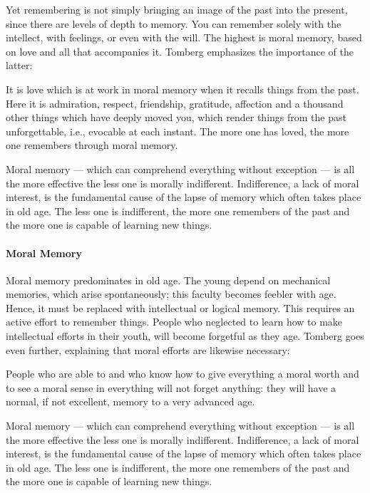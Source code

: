 Yet remembering is not simply bringing an image of the past into the present, since there are levels of depth to memory. You can remember solely with the intellect, with feelings, or even with the will. The highest is moral memory, based on love and all that accompanies it. Tomberg emphasizes the importance of the latter:

\begin{quotex}
It is love which is at work in moral memory when it recalls things from the past. Here it is admiration, respect, friendship, gratitude, affection and a thousand other things which have deeply moved you, which render things from the past unforgettable, i.e., evocable at each instant. The more one has loved, the more one remembers through moral memory.

Moral memory --- which can comprehend everything without exception --- is all the more effective the less one is morally indifferent. Indifference, a lack of moral interest, is the fundamental cause of the lapse of memory which often takes place in old age. The less one is indifferent, the more one remembers of the past and the more one is capable of learning new things.
\end{quotex}


\paragraph{Moral Memory}


Moral memory predominates in old age. The young depend on mechanical memories, which arise spontaneously; this faculty becomes feebler with age. Hence, it must be replaced with intellectual or logical memory. This requires an active effort to remember things. People who neglected to learn how to make intellectual efforts in their youth, will become forgetful as they age. Tomberg goes even further, explaining that moral efforts are likewise necessary:

\begin{quotex}
People who are able to and who know how to give everything a moral worth and to see a moral sense in everything will not forget anything: they will have a normal, if not excellent, memory to a very advanced age.

Moral memory --- which can comprehend everything without exception --- is all the more effective the less one is morally indifferent. Indifference, a lack of moral interest, is the fundamental cause of the lapse of memory which often takes place in old age. The less one is indifferent, the more one remembers of the past and the more one is capable of learning new things.
\end{quotex}


